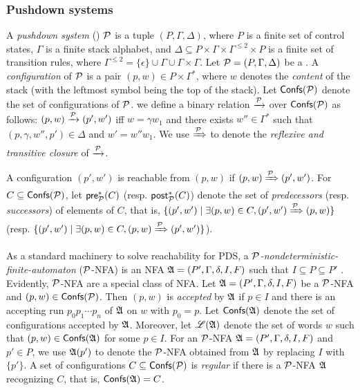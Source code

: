 \subsubsection{Pushdown systems}
A \emph{pushdown system} ({\PDS}) ${\mathcal{P} }$ is a tuple $(P,\Gamma,\Delta)$, where $P$ is a finite set of control states, $\Gamma$ is a finite stack alphabet, and $\Delta\subseteq P\times\Gamma\times\Gamma^{\le 2}\times P$ is a finite set of transition rules, where $\Gamma^{\le 2} = \{\epsilon\}\cup\Gamma\cup\Gamma\times\Gamma$.
Let ${\mathcal{P} }=(P,\Gamma,\Delta)$ be a {\PDS}. A \emph{configuration} of ${\mathcal{P} }$ is a pair $(p,w)\in P\times\Gamma^*$, where $w$ denotes the \emph{content} of the stack (with the leftmost symbol being the top of the stack). Let ${\mathsf{Confs} }({\mathcal{P} })$ denote the set of configurations of ${\mathcal{P} }$. we define a binary relation $\xrightarrow{{\mathcal{P} }}$ over ${\mathsf{Confs} }({\mathcal{P} })$ as follows: $(p,w)\xrightarrow{{\mathcal{P} }}(p',w')$ iff $w = \gamma w_1$ and there exists $w''\in\Gamma^*$ such that $(p,\gamma,w'',p')\in\Delta$ and $w'=w''w_1$. We use $\xRightarrow{{\mathcal{P} }}$ to denote the \emph{reflexive and transitive closure} of $\xrightarrow{{\mathcal{P} }}$.

A configuration $(p',w')$ is reachable from $(p,w)$ if $(p,w)\xRightarrow{{\mathcal{P} }}(p',w')$. For $C \subseteq {\mathsf{Confs} }({\mathcal{P} })$, let ${\mathsf{pre} }^*_{\mathcal{P} }(C)$ (resp. ${\mathsf{post} }^*_{\mathcal{P} }(C)$) denote the set of \emph{predecessors} (resp. \emph{successors}) of elements of $C$, that is, $\{(p',w')\mid \exists (p,w)\in C,(p',w')\xRightarrow{{\mathcal{P} }}(p,w)\}$ (resp. $\{(p',w')\mid \exists (p,w)\in C,(p,w)\xRightarrow{{\mathcal{P} }}(p',w')\}$).


As a standard machinery to solve reachability for PDS, a \emph{${\mathcal{P} }$-nondeterministic-finite-automaton} (${\mathcal{P} }$-NFA) is an NFA ${\mathfrak{A} }=(P', \Gamma, \delta, I, F)$ such that $I \subseteq P \subseteq P'$ \cite{BEM97}.
Evidently, ${\mathcal{P} }$-NFA are a special class of NFA. 
Let ${\mathfrak{A} } = (P', \Gamma, \delta, I, F)$ be a  ${\mathcal{P} }$-NFA and  $(p, w) \in {\mathsf{Confs} }({\mathcal{P} })$. Then $(p, w)$ is \emph{accepted} by ${\mathfrak{A} }$ if $p \in I$ and there is an accepting run $p_0 p_1 \cdots p_n$ of ${\mathfrak{A} }$ on $w$ with $p_0 = p$. Let ${\mathsf{Confs} }({\mathfrak{A} })$ denote the set of configurations accepted by ${\mathfrak{A} }$. Moreover, let ${\mathscr{L} }({\mathfrak{A} })$ denote the set of words $w$ such that $(p, w) \in {\mathsf{Confs} }({\mathfrak{A} })$ for some $p \in I$. 
For an ${\mathcal{P} }$-NFA ${\mathfrak{A} } = (P', \Gamma, \delta, I, F)$ and $p' \in P$, we use ${\mathfrak{A} }(p')$ to denote the ${\mathcal{P} }$-NFA obtained from ${\mathfrak{A} }$ by replacing $I$ with $\{p'\}$. A set of configurations $C \subseteq {\mathsf{Confs} }({\mathcal{P} })$ is \emph{regular} if there is a ${\mathcal{P} }$-NFA ${\mathfrak{A} }$ recognizing $C$, that is, ${\mathsf{Confs} }({\mathfrak{A} }) = C$. %

